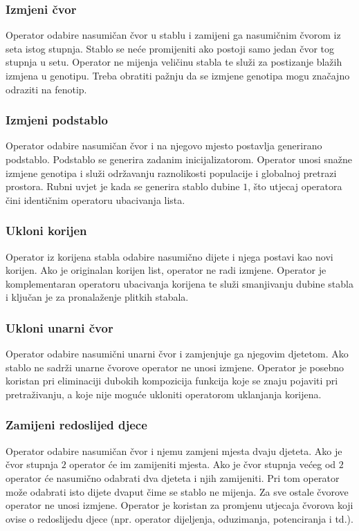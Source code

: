 \documentclass[times, utf8, numeric, diplomski]{fer}
\begin{document}
\subsubsection{Izmjeni čvor}
Operator odabire nasumičan čvor u stablu i zamijeni ga nasumičnim čvorom iz seta istog stupnja. Stablo se neće promijeniti ako postoji samo jedan čvor tog stupnja u setu. Operator ne mijenja veličinu stabla te služi za postizanje blažih izmjena u genotipu. Treba obratiti pažnju da se izmjene genotipa mogu značajno odraziti na fenotip.

\subsubsection{Izmjeni podstablo}
Operator odabire nasumičan čvor i na njegovo mjesto postavlja generirano podstablo. Podstablo se generira zadanim inicijalizatorom. Operator unosi snažne izmjene genotipa i služi održavanju raznolikosti populacije i globalnoj pretrazi prostora. Rubni uvjet je kada se generira stablo dubine $1$, što utjecaj operatora čini identičnim operatoru ubacivanja lista.

\subsubsection{Ukloni korijen}
Operator iz korijena stabla odabire nasumično dijete i njega postavi kao novi korijen. Ako je originalan korijen list, operator ne radi izmjene. Operator je komplementaran operatoru ubacivanja korijena te služi smanjivanju dubine stabla i ključan je za pronalaženje plitkih stabala.

\subsubsection{Ukloni unarni čvor}
Operator odabire nasumični unarni čvor i zamjenjuje ga njegovim djetetom. Ako stablo ne sadrži unarne čvorove operator ne unosi izmjene. Operator je posebno koristan pri eliminaciji dubokih kompozicija funkcija koje se znaju pojaviti pri pretraživanju, a koje nije moguće ukloniti operatorom uklanjanja korijena.

\subsubsection{Zamijeni redoslijed djece}
Operator odabire nasumičan čvor i njemu zamjeni mjesta dvaju djeteta. Ako je čvor stupnja $2$ operator će im zamijeniti mjesta. Ako je čvor stupnja većeg od $2$ operator će nasumično odabrati dva djeteta i njih zamijeniti. Pri tom operator može odabrati isto dijete dvaput čime se stablo ne mijenja. Za sve ostale čvorove operator ne unosi izmjene. Operator je koristan za promjenu utjecaja čvorova koji ovise o redoslijedu djece (npr. operator dijeljenja, oduzimanja, potenciranja i td.).
\end{document}
